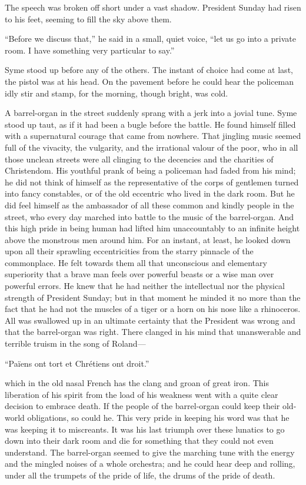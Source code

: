 The speech was broken off short under a vast shadow. President Sunday had risen to his feet, seeming to fill the sky above them.

“Before we discuss that,” he said in a small, quiet voice, “let us go into a private room. I have something very particular to say.”

Syme stood up before any of the others. The instant of choice had come at last, the pistol was at his head. On the pavement before he could hear the policeman idly stir and stamp, for the morning, though bright, was cold.

A barrel-organ in the street suddenly sprang with a jerk into a jovial tune. Syme stood up taut, as if it had been a bugle before the battle. He found himself filled with a supernatural courage that came from nowhere. That jingling music seemed full of the vivacity, the vulgarity, and the irrational valour of the poor, who in all those unclean streets were all clinging to the decencies and the charities of Christendom. His youthful prank of being a policeman had faded from his mind; he did not think of himself as the representative of the corps of gentlemen turned into fancy constables, or of the old eccentric who lived in the dark room. But he did feel himself as the ambassador of all these common and kindly people in the street, who every day marched into battle to the music of the barrel-organ. And this high pride in being human had lifted him unaccountably to an infinite height above the monstrous men around him. For an instant, at least, he looked down upon all their sprawling eccentricities from the starry pinnacle of the commonplace. He felt towards them all that unconscious and elementary superiority that a brave man feels over powerful beasts or a wise man over powerful errors. He knew that he had neither the intellectual nor the physical strength of President Sunday; but in that moment he minded it no more than the fact that he had not the muscles of a tiger or a horn on his nose like a rhinoceros. All was swallowed up in an ultimate certainty that the President was wrong and that the barrel-organ was right. There clanged in his mind that unanswerable and terrible truism in the song of Roland⁠—

    “Païens ont tort et Chrétiens ont droit.”

which in the old nasal French has the clang and groan of great iron. This liberation of his spirit from the load of his weakness went with a quite clear decision to embrace death. If the people of the barrel-organ could keep their old-world obligations, so could he. This very pride in keeping his word was that he was keeping it to miscreants. It was his last triumph over these lunatics to go down into their dark room and die for something that they could not even understand. The barrel-organ seemed to give the marching tune with the energy and the mingled noises of a whole orchestra; and he could hear deep and rolling, under all the trumpets of the pride of life, the drums of the pride of death.

